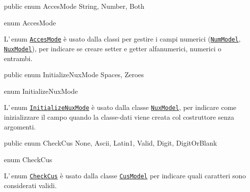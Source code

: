 \documentclass[a4paper,10pt]{report}
\newif\ifesource
\newenvironment{elisting}[1][H]
  {\captionsetup{aboveskip=0pt}\begin{listing}[#1]}
  {\end{listing}%
}
\begin{document}
\ifesource
\begin{lstlisting}[language=java, 
caption=enum AccesMode, 
label=lst:AccesMode]
public enum AccesMode { String, Number, Both }
\end{lstlisting}\index{AccesMode}
\else
\begin{elisting}
\begin{javacode}
public enum AccesMode { String, Number, Both }
\end{javacode}
\caption{enum AccesMode}\label{lst:AccesMode}
\end{elisting}
\fi
L'\,enum \hyperref[lst:AccesMode]{\texttt{AccesMode}} è usato 
dalla classi per gestire i campi numerici 
(\hyperref[lst:NumModel]{\texttt{NumModel}},
\hyperref[lst:NuxModel]{\texttt{NuxModel}}), per indicare se creare setter e
getter alfanumerici, numerici o entrambi.


\ifesource
\begin{lstlisting}[language=java, 
caption=enum InitializeNuxMode, 
label=lst:InitializeNuxMode]
public enum InitializeNuxMode { Spaces, Zeroes }
\end{lstlisting}\index{InitializeNuxMode}
\else
\begin{elisting}
\begin{javacode}
public enum InitializeNuxMode { Spaces, Zeroes }
\end{javacode}
\caption{enum InitializeNuxMode}\label{lst:InitializeNuxMode}
\end{elisting}
\fi
L'\,enum \hyperref[lst:InitializeNuxMode]{\texttt{InitializeNuxMode}} è usato 
dalla classe \hyperref[lst:NuxModel]{\texttt{NuxModel}}, per indicare come 
inizializzare il campo quando la classe-dati viene creata col costruttore senza
argomenti.

\ifesource
\begin{lstlisting}[language=java, 
caption=enum CheckCus, 
label=lst:CheckCus]
public enum CheckCus { None, Ascii, Latin1, Valid, Digit, DigitOrBlank }
\end{lstlisting}\index{CheckCus}
\else
\begin{elisting}
\begin{javacode}
public enum CheckCus { None, Ascii, Latin1, Valid, Digit, DigitOrBlank }
\end{javacode}
\caption{enum CheckCus}\label{lst:CheckCus}
\end{elisting}
\fi
L'\,enum \hyperref[lst:CheckCus]{\texttt{CheckCus}} è usato dalla classe
\hyperref[lst:CusModel]{\texttt{CusModel}} per indicare quali caratteri sono
considerati validi.
\end{document}
